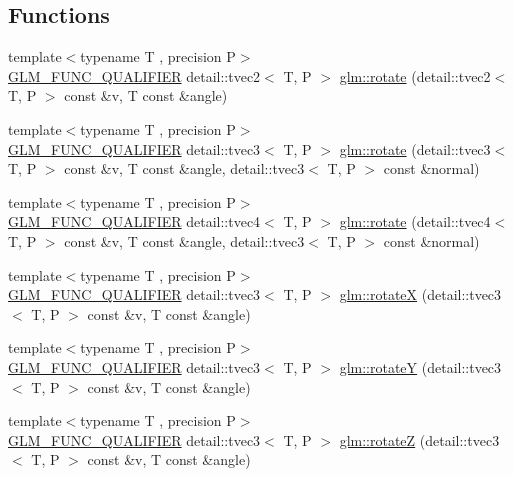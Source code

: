 \subsection*{Functions}
\begin{DoxyCompactItemize}
\item 
{\footnotesize template$<$typename T , precision P$>$ }\\\hyperlink{setup_8hpp_a33fdea6f91c5f834105f7415e2a64407}{G\+L\+M\+\_\+\+F\+U\+N\+C\+\_\+\+Q\+U\+A\+L\+I\+F\+I\+ER} detail\+::tvec2$<$ T, P $>$ \hyperlink{group__gtx__rotate__vector_ga5520f6dd671807ec62a8f97c00c1b78b}{glm\+::rotate} (detail\+::tvec2$<$ T, P $>$ const \&v, T const \&angle)
\item 
{\footnotesize template$<$typename T , precision P$>$ }\\\hyperlink{setup_8hpp_a33fdea6f91c5f834105f7415e2a64407}{G\+L\+M\+\_\+\+F\+U\+N\+C\+\_\+\+Q\+U\+A\+L\+I\+F\+I\+ER} detail\+::tvec3$<$ T, P $>$ \hyperlink{group__gtx__rotate__vector_ga4eccdf3769ce3b5d1e4018394290f88c}{glm\+::rotate} (detail\+::tvec3$<$ T, P $>$ const \&v, T const \&angle, detail\+::tvec3$<$ T, P $>$ const \&normal)
\item 
{\footnotesize template$<$typename T , precision P$>$ }\\\hyperlink{setup_8hpp_a33fdea6f91c5f834105f7415e2a64407}{G\+L\+M\+\_\+\+F\+U\+N\+C\+\_\+\+Q\+U\+A\+L\+I\+F\+I\+ER} detail\+::tvec4$<$ T, P $>$ \hyperlink{group__gtx__rotate__vector_gac4abb6be47bd14303d6eded41f2f65f1}{glm\+::rotate} (detail\+::tvec4$<$ T, P $>$ const \&v, T const \&angle, detail\+::tvec3$<$ T, P $>$ const \&normal)
\item 
{\footnotesize template$<$typename T , precision P$>$ }\\\hyperlink{setup_8hpp_a33fdea6f91c5f834105f7415e2a64407}{G\+L\+M\+\_\+\+F\+U\+N\+C\+\_\+\+Q\+U\+A\+L\+I\+F\+I\+ER} detail\+::tvec3$<$ T, P $>$ \hyperlink{group__gtx__rotate__vector_gadb69cdc8ea08715c9d8a74f587cf0eac}{glm\+::rotateX} (detail\+::tvec3$<$ T, P $>$ const \&v, T const \&angle)
\item 
{\footnotesize template$<$typename T , precision P$>$ }\\\hyperlink{setup_8hpp_a33fdea6f91c5f834105f7415e2a64407}{G\+L\+M\+\_\+\+F\+U\+N\+C\+\_\+\+Q\+U\+A\+L\+I\+F\+I\+ER} detail\+::tvec3$<$ T, P $>$ \hyperlink{group__gtx__rotate__vector_gae1e673b7a464218ce6a5e8f02145f877}{glm\+::rotateY} (detail\+::tvec3$<$ T, P $>$ const \&v, T const \&angle)
\item 
{\footnotesize template$<$typename T , precision P$>$ }\\\hyperlink{setup_8hpp_a33fdea6f91c5f834105f7415e2a64407}{G\+L\+M\+\_\+\+F\+U\+N\+C\+\_\+\+Q\+U\+A\+L\+I\+F\+I\+ER} detail\+::tvec3$<$ T, P $>$ \hyperlink{group__gtx__rotate__vector_gae5c27548f86f1e95f76a87cf16f512da}{glm\+::rotateZ} (detail\+::tvec3$<$ T, P $>$ const \&v, T const \&angle)

\end{DoxyCompactItemize}
